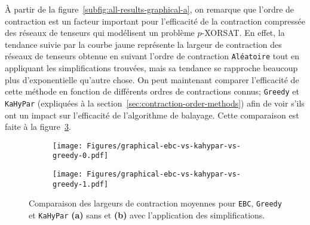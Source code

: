 À partir de la figure~\ref{subfig:all-results-graphical-a}, on remarque que l'ordre de contraction  est un facteur important pour l'efficacité de la contraction compressée des réseaux de tenseurs qui modélisent un problème $p$-XORSAT.
En effet, la tendance suivie par la courbe jaune représente la largeur de contraction des réseaux de tenseurs obtenue en suivant l'ordre de contraction \verb|Aléatoire| tout en appliquant les simplifications trouvées, mais sa tendance se rapproche beaucoup plus d'exponentielle qu'autre chose.
On peut maintenant comparer l'efficacité de cette méthode en fonction de différents ordres de contractions connus; \verb|Greedy| et \verb|KaHyPar| (expliquées à la section~\ref{sec:contraction-order-methods}) afin de voir s'ils ont un impact sur l'efficacité de l'algorithme de balayage.
Cette comparaison est faite à la figure~\ref{fig:graphical-ebc-greedy-kahypar}.
\begin{figure}[h]
    \centering
    \begin{subfigure}{.49\textwidth}
        \centering
        \texttt{[image: Figures/graphical-ebc-vs-kahypar-vs-greedy-0.pdf]}
        \caption{}
        \label{subfig:graphical-ebc-greedy-kahypar-a}
    \end{subfigure}
    \hfill
    \begin{subfigure}{.49\textwidth}
        \centering
        \texttt{[image: Figures/graphical-ebc-vs-kahypar-vs-greedy-1.pdf]}
        \caption{}
        \label{subfig:graphical-ebc-greedy-kahypar-b}
    \end{subfigure}
    \caption{Comparaison des largeurs de contraction moyennes pour \texttt{EBC}, \texttt{Greedy} et \texttt{KaHyPar} \textbf{(a)} sans et \textbf{(b)} avec l'application des simplifications.}
    \label{fig:graphical-ebc-greedy-kahypar}
\end{figure}

